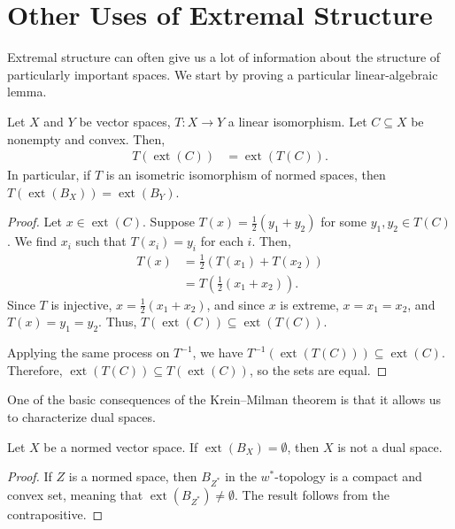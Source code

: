 \documentclass[10pt]{mypackage}
\begin{document}
\section{Other Uses of Extremal Structure}%
Extremal structure can often give us a lot of information about the structure of particularly important spaces. We start by proving a particular linear-algebraic lemma.
\begin{lemma}
  Let $X$ and $Y$ be vector spaces, $T\colon X\rightarrow Y$ a linear isomorphism. Let $C\subseteq X$ be nonempty and convex. Then,
  \begin{align*}
    T\left( \operatorname{ext}\left( C \right) \right) &= \operatorname{ext}\left( T(C) \right).
  \end{align*}
  In particular, if $T$ is an isometric isomorphism of normed spaces, then $T\left( \operatorname{ext}\left( B_X \right) \right) = \operatorname{ext}\left( B_Y \right)$.
\end{lemma}
\begin{proof}
  Let $x\in \operatorname{ext}\left( C \right)$. Suppose $T(x) = \frac{1}{2}\left( y_1 + y_2 \right)$ for some $y_1,y_2\in T(C)$. We find $x_i$ such that $T\left( x_i \right) = y_i$ for each $i$. Then,
  \begin{align*}
    T\left( x \right) &= \frac{1}{2}\left( T\left( x_1 \right) + T\left( x_2 \right) \right)\\
                      &= T\left( \frac{1}{2}\left( x_1 + x_2 \right) \right).
  \end{align*}
  Since $T$ is injective, $x = \frac{1}{2}\left( x_1 + x_2 \right)$, and since $x$ is extreme, $x= x_1 = x_2$, and $T(x) = y_1=  y_2$. Thus, $T\left( \operatorname{ext}\left( C \right) \right)\subseteq \operatorname{ext}\left( T\left( C \right) \right)$.\newline

  Applying the same process on $T^{-1}$, we have $T^{-1}\left( \operatorname{ext}\left( T(C) \right) \right)\subseteq \operatorname{ext}\left( C \right)$. Therefore, $\operatorname{ext}\left( T(C) \right)\subseteq T\left( \operatorname{ext}\left( C \right) \right)$, so the sets are equal.
\end{proof}
One of the basic consequences of the Krein--Milman theorem is that it allows us to characterize dual spaces.
\begin{theorem}
  Let $X$ be a normed vector space. If $\operatorname{ext}\left( B_X \right) = \emptyset$, then $X$ is not a dual space.
\end{theorem}
\begin{proof}
  If $Z$ is a normed space, then $B_{Z^{\ast}}$ in the $w^{\ast}$-topology is a compact and convex set, meaning that $\operatorname{ext}\left( B_{Z^{\ast}} \right)\neq \emptyset$. The result follows from the contrapositive.
\end{proof}
\end{document}
